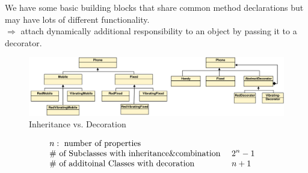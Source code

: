 \begin{figure}[H]	
  \centering
    \resizebox{\linewidth}{!}{\tikzset{font=\Huge}}
\end{figure}
\begin{intentbox}[Intent]
  We have some basic building blocks that share common method declarations
  but may have lots of different functionality.\\
  $\Rightarrow$ attach dynamically additional responsibility to an object by
  passing it to a decorator.
  \begin{figure}[H]
    \centering
    \includegraphics[width=1.0\textwidth]{figures/decoratorExplosion.png}
    \caption{Inheritance vs. Decoration}
    \vspace{-1em}
  \end{figure}
  \begin{align*}
    &n: \text{ number of properties}\\[-1\jot]
    &\text{\# of Subclasses with inheritance\&combination }&&2^n-1 \\[-1\jot]
    &\text{\# of additoinal Classes with decoration }&&n+1
  \end{align*}
\end{intentbox}
